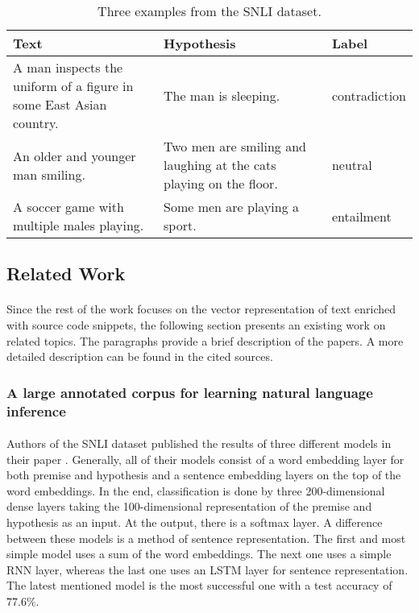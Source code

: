 \begin{table}[h!]
	\begin{center}
		\begin{tabular}{p{5cm} p{5cm} p{2cm}} 
			\hline
			\textbf{Text} & \textbf{Hypothesis} & \textbf{Label} \\ [0.5ex] 
			\hline\hline
			A man inspects the uniform of a figure in some East Asian country. & The man is sleeping. & contradiction \\ 
			\hline
			An older and younger man smiling. & Two men are smiling and laughing at the cats playing on the floor. & neutral \\
			\hline
			A soccer game with multiple males playing. & Some men are playing a sport. & entailment \\ 
			\hline
		\end{tabular}
	\end{center}
	\caption{Three examples from the SNLI dataset.}
	\label{SNLI_examples}
\end{table}

\subsection{Related Work}\label{semantic_similarity_related_work}
\paragraph{}
Since the rest of the work focuses on the vector representation of text enriched with source code snippets, the following section presents an existing work on related topics. The paragraphs provide a brief description of the papers. A more detailed description can be found in the cited sources.

\subsubsection{A large annotated corpus for learning natural language inference}
\paragraph{}
Authors of the SNLI dataset published the results of three different models in their paper \cite{snli}. Generally, all of their models consist of a word embedding layer for both premise and hypothesis and a sentence embedding layers on the top of the word embeddings. In the end, classification is done by three 200-dimensional dense layers taking the 100-dimensional representation of the premise and hypothesis as an input. At the output, there is a softmax layer. A difference between these models is a method of sentence representation. The first and most simple model uses a sum of the word embeddings. The next one uses a simple RNN layer, whereas the last one uses an LSTM layer for sentence representation. The latest mentioned model is the most successful one with a test accuracy of $77.6\%$.

